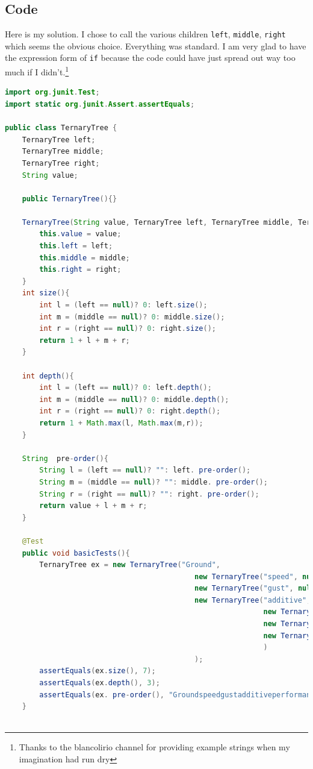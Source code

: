 \documentclass[twoside=false,DIV=14]{scrartcl}
\begin{document}
\subsection{Code}
Here is my solution.  I chose to call the various children \verb+left+, \verb+middle+, \verb+right+ which seems the obvious choice.  Everything was standard.  I am very glad to have the expression form of \verb+if+ because the code could have just spread out way too much if I didn't.\footnote{Thanks to the blancolirio channel for providing example strings when my imagination had run dry}
{\scriptsize
\begin{lstlisting}[language=java]
import org.junit.Test;
import static org.junit.Assert.assertEquals;

public class TernaryTree {
    TernaryTree left;
    TernaryTree middle;
    TernaryTree right;
    String value;

    public TernaryTree(){}

    TernaryTree(String value, TernaryTree left, TernaryTree middle, TernaryTree right){
        this.value = value;
        this.left = left;
        this.middle = middle;
        this.right = right;
    }
    int size(){
        int l = (left == null)? 0: left.size();
        int m = (middle == null)? 0: middle.size();
        int r = (right == null)? 0: right.size();
        return 1 + l + m + r;
    }

    int depth(){
        int l = (left == null)? 0: left.depth();
        int m = (middle == null)? 0: middle.depth();
        int r = (right == null)? 0: right.depth();
        return 1 + Math.max(l, Math.max(m,r));
    }

    String  pre-order(){
        String l = (left == null)? "": left. pre-order();
        String m = (middle == null)? "": middle. pre-order();
        String r = (right == null)? "": right. pre-order();
        return value + l + m + r;
    }

    @Test
    public void basicTests(){
        TernaryTree ex = new TernaryTree("Ground",
                                            new TernaryTree("speed", null, null, null),
                                            new TernaryTree("gust", null, null, null),
                                            new TernaryTree("additive", 
                                                            new TernaryTree("performance", null, null, null),
                                                            new TernaryTree("back", null, null, null),
                                                            new TernaryTree("idle", null, null, null)
                                                            )
                                            );
        assertEquals(ex.size(), 7);
        assertEquals(ex.depth(), 3);
        assertEquals(ex. pre-order(), "Groundspeedgustadditiveperformancebackidle");
    }
    

\end{lstlisting}}
\end{document}
